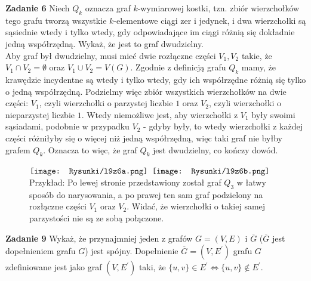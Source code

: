 \documentclass[a4paper,12pt]{article}
\newcommand{\comp}[1]{\overline{ #1 }} 					%
\begin{document}
\newpage
\noindent \textbf{Zadanie 6} \newline
Niech $Q_k$ oznacza graf $k$-wymiarowej kostki, tzn. zbiór wierzchołków tego grafu
tworzą wszystkie $k$-elementowe ciągi zer i jedynek, i dwa wierzchołki są sąsiednie
wtedy i tylko wtedy, gdy odpowiadające im ciągi różnią się dokładnie jedną 
współrzędną. Wykaż, że jest to graf dwudzielny. \\

\noindent Aby graf był dwudzielny, musi mieć dwie rozłączne części $V_1, V_2$ takie, 
że $V_1 \cap V_2 = \emptyset$ oraz $V_1 \cup V_2 = V(G)$. Zgodnie z definicją grafu 
$Q_k$ mamy, że krawędzie incydentne są wtedy i tylko wtedy, gdy ich współrzędne 
różnią się tylko o jedną współrzędną. Podzielmy więc zbiór wszystkich wierzchołków
na dwie części: $V_1$, czyli wierzchołki o parzystej liczbie $1$ oraz $V_2$, czyli
wierzchołki o nieparzystej liczbie $1$. Wtedy niemożliwe jest, aby wierzchołki 
z $V_1$ były swoimi sąsiadami, podobnie w przypadku $V_2$ - gdyby były, to wtedy 
wierzchołki z każdej części różniłyby się o więcej niż jedną współrzędną, więc 
taki graf nie byłby grafem $Q_k$. Oznacza to więc, że graf $Q_k$ jest dwudzielny,
co kończy dowód.

\begin{figure}[H]
	\centering
	$\vcenter{\hbox{\texttt{[image: Rysunki/l9z6a.png]}}}$
    $\vcenter{\hbox{\texttt{[image: Rysunki/l9z6b.png]}}}$
    \\ Przykład: Po lewej stronie przedstawiony został graf $Q_3$ w łatwy sposób
    do narysowania, a po prawej ten sam graf podzielony na rozłączne części $V_1$
    oraz $V_2$. Widać, że wierzchołki o takiej samej parzystości nie są ze sobą
    połączone.
\end{figure}


\newpage
\noindent \textbf{Zadanie 9} \newline
Wykaż, że przynajmniej jeden z grafów $G = (V, E)$ i $\comp{G}$ ($\comp{G}$ jest 
dopełnieniem grafu $G$) jest spójny. Dopełnienie $\comp{G} = (V, E^\prime)$ grafu
$G$ zdefiniowane jest jako graf $(V, E^\prime)$ taki, że $\{ u, v \} \in E^\prime
\Leftrightarrow \{ u, v \} \notin E^\prime$. \\
\end{document}
